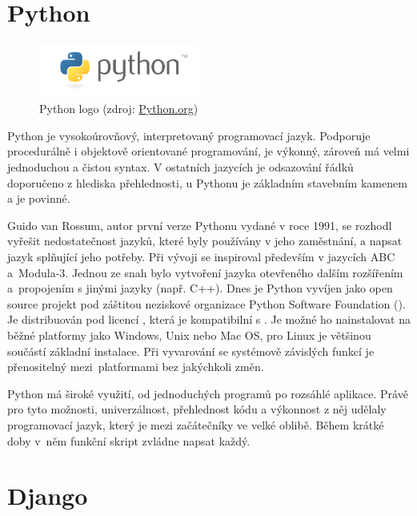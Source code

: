 \newpage

\section{Python}

\begin{figure}[H] \centering
      \includegraphics[width=150pt]{./pictures/python-logo-master-v3-TM.png}
      \caption[Python logo]{Python logo (zdroj:
\href{https://www.python.org/static/community_logos/python-logo-master-v3-TM.png}{Python.org})}
      \label{fig:python}
  \end{figure}
  
Python je vysokoúrovňový, interpretovaný programovací jazyk. Podporuje
procedurálně i objektově orientované programování, je výkonný, zároveň
má velmi jednoduchou a čistou syntax. V ostatních jazycích je
odsazování řádků doporučeno z hlediska přehlednosti, u Pythonu je
základním stavebním kamenem a je povinné.

Guido van Rossum, autor první verze Pythonu vydané v roce 1991, se
rozhodl vyřešit nedostatečnost jazyků, které byly používány v jeho
zaměstnání, a napsat jazyk splňující jeho potřeby. Při vývoji se
inspiroval především v jazycích ABC a~Modula-3. Jednou ze snah bylo
vytvoření jazyka otevřeného dalším rozšířením a~propojením s jinými
jazyky (např. C++). Dnes je Python vyvíjen jako open source projekt
pod záštitou neziskové organizace Python Software Foundation
(). Je distribuován pod licencí , která je
kompatibilní s . Je možné ho nainstalovat na běžné platformy
jako Windows, Unix nebo Mac OS, pro Linux je většinou součástí
základní instalace. Při vyvarování se systémově závislých funkcí je
přenositelný mezi~platformami bez jakýchkoli změn.

Python má široké využití, od jednoduchých programů po rozsáhlé
aplikace. Právě pro tyto možnosti, univerzálnost, přehlednost kódu a
výkonnost z něj udělaly programovací jazyk, který je mezi začátečníky ve
velké oblibě. Během krátké doby v~něm funkční skript zvládne napsat
každý.
  

\newpage
  
\section{Django}

